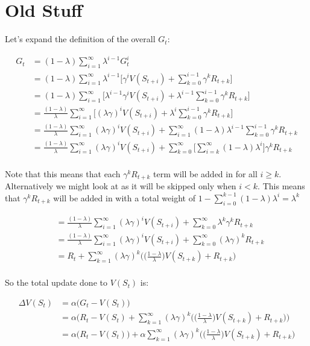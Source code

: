 \documentclass[11pt]{article}
\begin{document}
\section{Old Stuff}

Let's expand the definition of the overall $G_t$:

\begin{align*}
G_t &= (1-\lambda) \sum_{i=1}^{\infty} \lambda^{i-1}G^i_t \\
&= (1-\lambda) \sum_{i=1}^{\infty} \lambda^{i-1} \big[ \gamma^i V(S_{t+i}) + \sum_{k=0}^{i - 1} \gamma^k R_{t+k} \big] \\
&= (1-\lambda) \sum_{i=1}^{\infty} \big[ \lambda^{i-1} \gamma^i V(S_{t+i}) + \lambda^{i-1}\sum_{k=0}^{i - 1} \gamma^k R_{t+k} \big] \\
&= \frac{(1-\lambda)}{\lambda} \sum_{i=1}^{\infty} \big[ (\lambda \gamma)^i V(S_{t+i}) + \lambda^{i}\sum_{k=0}^{i - 1} \gamma^k R_{t+k} \big] \\
&= \frac{(1-\lambda)}{\lambda} \sum_{i=1}^{\infty} (\lambda \gamma)^i V(S_{t+i}) + \sum_{i=1}^{\infty} (1 - \lambda) \lambda^{i - 1}\sum_{k=0}^{i - 1} \gamma^k R_{t+k} \\
&= \frac{(1-\lambda)}{\lambda} \sum_{i=1}^{\infty} (\lambda \gamma)^i V(S_{t+i}) + \sum_{k=0}^\infty \big[ \sum_{i=k}^\infty (1 - \lambda)\lambda^i \big]\gamma^k R_{t+k} \\
\end{align*}

Note that this means that each $\gamma^k R_{t+k}$ term will be added in for all $i \geq k$.
Alternatively we might look at as it will be skipped only when $i < k$.
This means that $\gamma^k R_{t+k}$ will be added in with a total weight of $1 - \sum_{i=0}^{k - 1} (1 - \lambda) \lambda^{i} = \lambda^k$

\begin{align*}
&= \frac{(1-\lambda)}{\lambda} \sum_{i=1}^{\infty} (\lambda \gamma)^i V(S_{t+i}) + \sum_{k=0}^\infty \lambda^k \gamma^k R_{t+k} \\
&= \frac{(1-\lambda)}{\lambda} \sum_{i=1}^{\infty} (\lambda \gamma)^i V(S_{t+i}) + \sum_{k=0}^\infty (\lambda \gamma)^k R_{t+k} \\
&= R_t + \sum_{k=1}^{\infty} (\lambda \gamma)^k \bigg(\big(\frac{1 - \lambda}{\lambda}\big)V(S_{t+k}) + R_{t+k} \bigg) \\
\end{align*}

So the total update done to $V(S_t)$ is:

\begin{align*}
\Delta V(S_t) &= \alpha\big(G_t - V(S_t)\big) \\
&= \alpha\Big(R_t - V(S_t) + \sum_{k=1}^{\infty} (\lambda \gamma)^k \bigg(\big(\frac{1 - \lambda}{\lambda}\big)V(S_{t+k}) + R_{t+k} \bigg) \Big) \\
&= \alpha\big(R_t - V(S_t) \big) + \alpha \sum_{k=1}^{\infty} (\lambda \gamma)^k \bigg(\big(\frac{1 - \lambda}{\lambda}\big)V(S_{t+k}) + R_{t+k} \bigg)  \\
\end{align*}
\end{document}
